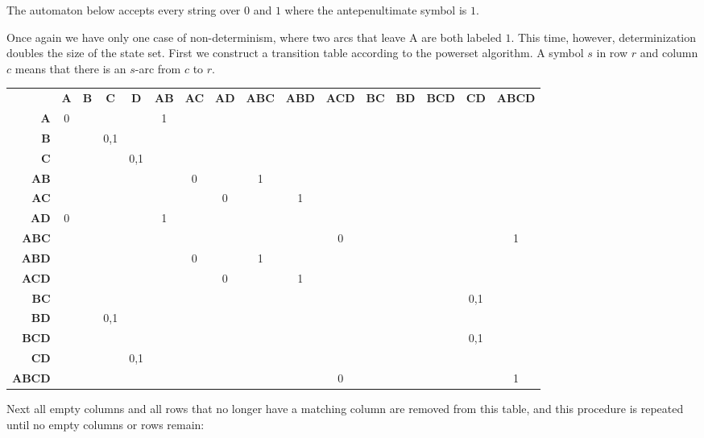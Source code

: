 \begin{examplebox}
    The automaton below accepts every string over $0$ and $1$ where the antepenultimate symbol is $1$.
    \begin{center}
        
    \end{center}
    Once again we have only one case of non-determinism, where two arcs that leave A are both labeled $1$.
    This time, however, determinization doubles the size of the state set.
    First we construct a transition table according to the powerset algorithm.
    A symbol $s$ in row $r$ and column $c$ means that there is an $s$-arc from $c$ to $r$.
    \begin{center}
        \footnotesize
        \begin{tabular}{rccccccccccccccc}
            & \textbf{A} & \textbf{B} & \textbf{C} & \textbf{D} & \textbf{AB} & \textbf{AC} & \textbf{AD} & \textbf{ABC} & \textbf{ABD} & \textbf{ACD} & \textbf{BC} & \textbf{BD} & \textbf{BCD} & \textbf{CD} & \textbf{ABCD}\\
            \textbf{A} & 0 & & & & 1\\
            \textbf{B} & & & 0,1\\
            \textbf{C} & & & & 0,1\\
            \textbf{AB} & & & & & & 0 & & 1\\
            \textbf{AC} & & & & & & & 0 & & 1\\
            \textbf{AD} & 0 & & & & 1\\ 
            \textbf{ABC} & & & & & & & & & & 0 & & & & & 1\\
            \textbf{ABD} & & & & & & 0 & & 1\\
            \textbf{ACD} & & & & & & & 0 & & 1\\
            \textbf{BC} & & & & & & & & & & & & & & 0,1\\
            \textbf{BD} & & & 0,1\\ 
            \textbf{BCD} & & & & & & & & & & & & & & 0,1\\
            \textbf{CD} & & & & 0,1\\
            \textbf{ABCD} & & & & & & & & & & 0 & & & & & 1\\
        \end{tabular}
    \end{center}
    Next all empty columns and all rows that no longer have a matching column are removed from this table, and this procedure is repeated until no empty columns or rows remain:

\end{examplebox}
